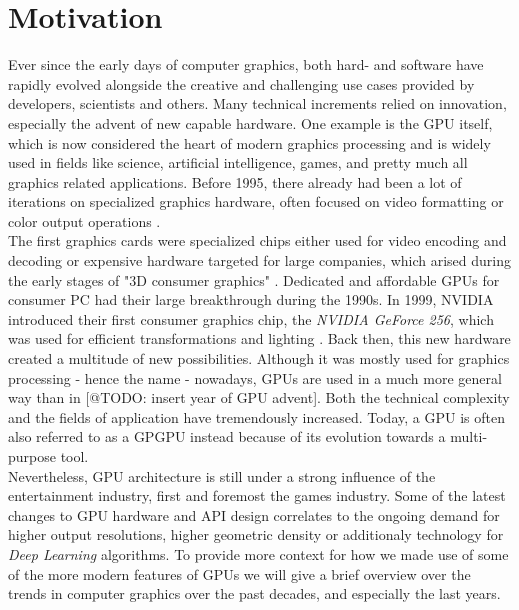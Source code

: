 \chapter{Motivation} \label{cpt-motivation}


Ever since the early days of computer graphics, both hard- and software have rapidly evolved
alongside the creative and challenging use cases provided by developers, scientists and others.
Many technical increments relied on innovation, especially the advent of new capable hardware.
One example is the \ac{GPU} itself, which is now considered the heart of modern graphics 
processing and is widely used in fields like science, artificial intelligence, games, and pretty 
much all graphics related applications. Before 1995, there already had been a lot of iterations 
on specialized graphics hardware, often focused on video formatting or color output operations
\cite{Singer2023}. \\

\noindent
The first graphics cards were specialized chips either used for video encoding and decoding
or expensive hardware targeted for large companies, which arised during the early stages 
of "3D consumer graphics" \cite{Singer2023}. Dedicated and affordable \ac{GPU}s for consumer 
\ac{PC} had their large breakthrough during the 1990s. In 1999, NVIDIA introduced their 
first consumer graphics chip, the \emph{NVIDIA GeForce 256}, which was used for efficient 
transformations and lighting \cite{Fenno2024}. Back then, this new hardware created a multitude 
of new possibilities. 
Although it was mostly used for graphics processing - hence the name - nowadays, \ac{GPU}s
are used in a much more general way than in [@TODO: insert year of GPU advent]. Both the 
technical complexity and the fields of application have tremendously increased. Today, a 
\ac{GPU} is often also referred to as a \ac{GPGPU} instead because of its evolution towards 
a multi-purpose tool. \\

\noindent
Nevertheless, \ac{GPU} architecture is still under a strong influence of the entertainment 
industry, first and foremost the games industry. Some of the latest changes to \ac{GPU} 
hardware and \ac{API} design correlates to the ongoing demand for higher output resolutions, 
higher geometric density or additionaly technology for \emph{Deep Learning} algorithms. 
To provide more context for how we made use of some of the more modern features of \ac{GPU}s 
we will give a brief overview over the trends in computer graphics over the past decades, and 
especially the last years.



